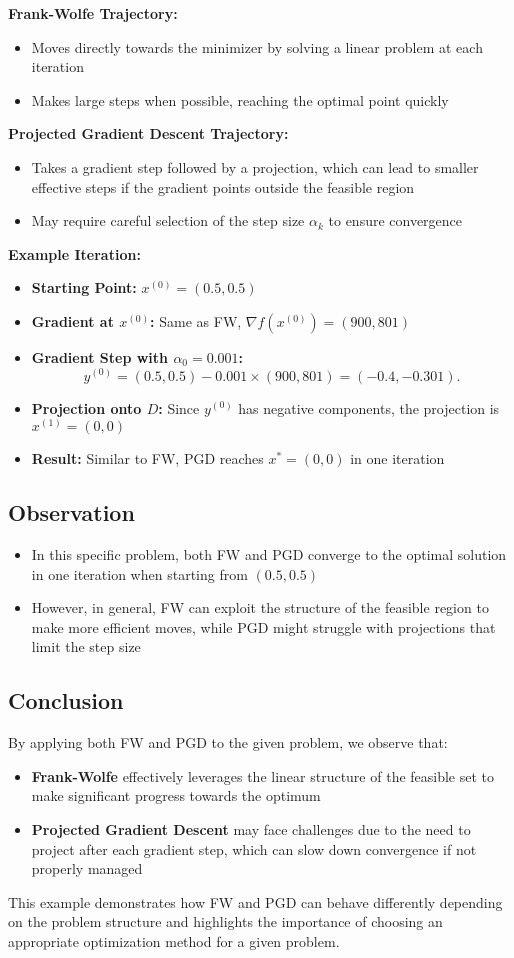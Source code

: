 \documentclass{article}
\begin{document}
\textbf{Frank-Wolfe Trajectory:}
\begin{itemize}
    \item Moves directly towards the minimizer by solving a linear problem at each iteration
    \item Makes large steps when possible, reaching the optimal point quickly
\end{itemize}

\textbf{Projected Gradient Descent Trajectory:}
\begin{itemize}
    \item Takes a gradient step followed by a projection, which can lead to smaller effective steps if the gradient points outside the feasible region
    \item May require careful selection of the step size $\alpha_k$ to ensure convergence
\end{itemize}

\textbf{Example Iteration:}
\begin{itemize}
    \item \textbf{Starting Point:} $x^{(0)} = (0.5, 0.5)$
    \item \textbf{Gradient at $x^{(0)}$:} Same as FW, $\nabla f(x^{(0)}) = (900, 801)$
    \item \textbf{Gradient Step with $\alpha_0 = 0.001$:}
    \[y^{(0)} = (0.5, 0.5) - 0.001 \times (900, 801) = (-0.4, -0.301).\]
    \item \textbf{Projection onto $D$:} Since $y^{(0)}$ has negative components, the projection is $x^{(1)} = (0, 0)$
    \item \textbf{Result:} Similar to FW, PGD reaches $x^* = (0, 0)$ in one iteration
\end{itemize}

\subsection*{Observation}
\begin{itemize}
    \item In this specific problem, both FW and PGD converge to the optimal solution in one iteration when starting from $(0.5, 0.5)$
    \item However, in general, FW can exploit the structure of the feasible region to make more efficient moves, while PGD might struggle with projections that limit the step size
\end{itemize}

\subsection*{Conclusion}
By applying both FW and PGD to the given problem, we observe that:
\begin{itemize}
    \item \textbf{Frank-Wolfe} effectively leverages the linear structure of the feasible set to make significant progress towards the optimum
    \item \textbf{Projected Gradient Descent} may face challenges due to the need to project after each gradient step, which can slow down convergence if not properly managed
\end{itemize}

This example demonstrates how FW and PGD can behave differently depending on the problem structure and highlights the importance of choosing an appropriate optimization method for a given problem.
\end{document}

